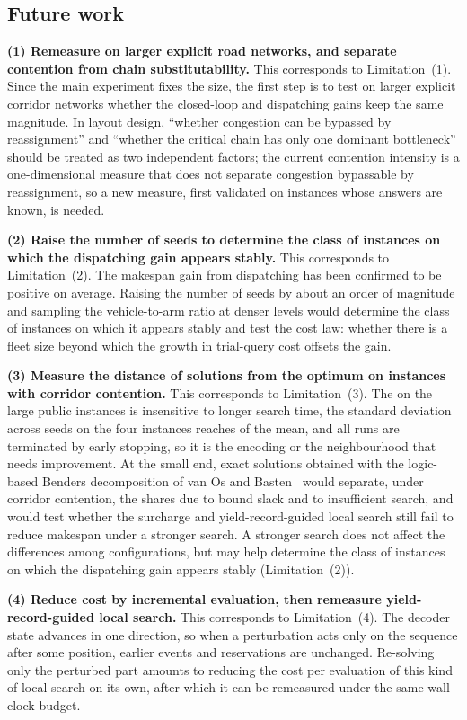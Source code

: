 \subsection{Future work}
\label{sec:future_work}

\textbf{(1) Remeasure on larger explicit road networks, and separate contention from chain substitutability.}
This corresponds to Limitation~(1). Since the main experiment fixes the size, the first step is to test on larger explicit corridor networks whether the closed-loop and dispatching gains keep the same magnitude. In layout design, ``whether congestion can be bypassed by reassignment'' and ``whether the critical chain has only one dominant bottleneck'' should be treated as two independent factors; the current contention intensity is a one-dimensional measure that does not separate congestion bypassable by reassignment, so a new measure, first validated on instances whose answers are known, is needed.

\textbf{(2) Raise the number of seeds to determine the class of instances on which the dispatching gain appears stably.}
This corresponds to Limitation~(2). The makespan gain from dispatching has been confirmed to be positive on average. Raising the number of seeds by about an order of magnitude and sampling the vehicle-to-arm ratio at denser levels would determine the class of instances on which it appears stably and test the cost law: whether there is a fleet size beyond which the growth in trial-query cost offsets the gain.

\textbf{(3) Measure the distance of solutions from the optimum on instances with corridor contention.}
This corresponds to Limitation~(3). The \PubGapBig{} on the large public instances is insensitive to longer search time, the standard deviation across seeds on the four instances reaches \PubCvBig{} of the mean, and all runs are terminated by early stopping, so it is the encoding or the neighbourhood that needs improvement.
At the small end, exact solutions obtained with the logic-based Benders decomposition of van Os and Basten~\cite{vanos2026exact} would separate, under corridor contention, the shares due to bound slack and to insufficient search, and would test whether the surcharge and yield-record-guided local search still fail to reduce makespan under a stronger search.
A stronger search does not affect the differences among configurations, but may help determine the class of instances on which the dispatching gain appears stably (Limitation~(2)).

\textbf{(4) Reduce cost by incremental evaluation, then remeasure yield-record-guided local search.}
This corresponds to Limitation~(4). The decoder state advances in one direction, so when a perturbation acts only on the sequence after some position, earlier events and reservations are unchanged. Re-solving only the perturbed part amounts to reducing the cost per evaluation of this kind of local search on its own, after which it can be remeasured under the same wall-clock budget.


